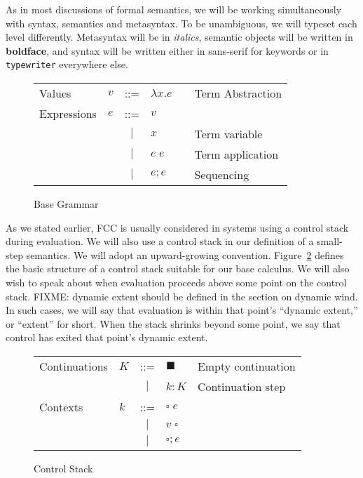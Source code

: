 \documentclass[11pt]{article}
\begin{document}
As in most discussions of formal semantics, we will be working simultaneously with syntax, semantics and metasyntax. To be unambiguous, we will typeset each level differently. Metasyntax will be in \textit{italics}, semantic objects will be written in \textbf{boldface}, and syntax will be written either in \textsf{sans-serif} for keywords or in \texttt{typewriter} everywhere else.

\begin{figure}[h]
\caption{Base Grammar}
\label{fig:startGrammar}

\begin{tabular}{llclll}
Values & $v$ & ::= & $\lambda x.e$ && Term Abstraction\\
Expressions & $e$ & ::= & $v$ && \\
& & $|$ & $x$ && Term variable \\
& & $|$ & $e\;e$ && Term application \\
& & $|$ & $e;e$ && Sequencing \\
\end{tabular}
\end{figure}

As we stated earlier, FCC is usually considered in systems using a control stack during evaluation.
We will also use a control stack in our definition of a small-step semantics.
We will adopt an upward-growing convention.
Figure~\ref{fig:controlStack} defines the basic structure of a control stack suitable for our base calculus.
We will also wish to speak about when evaluation proceeds above some point on the control stack.
FIXME: dynamic extent should be defined in the section on dynamic wind.
In such cases, we will say that evaluation is within that point's ``dynamic extent,'' or ``extent'' for short.
When the stack shrinks beyond some point, we say that control has exited that point's dynamic extent.

\begin{figure}[h!]
\caption{Control Stack}
\label{fig:controlStack}
\begin{tabular}{llcll}
Continuations & $K$ & ::= & $\blacksquare$ & Empty continuation \\
& & $|$ & $k:K$ & Continuation step \\
Contexts & $k$ & ::= & $\square\;e$\\
& & $|$ & $v\;\square$ \\
& & $|$ & $\square;e$ \\
\end{tabular}
\end{figure}
\end{document}
